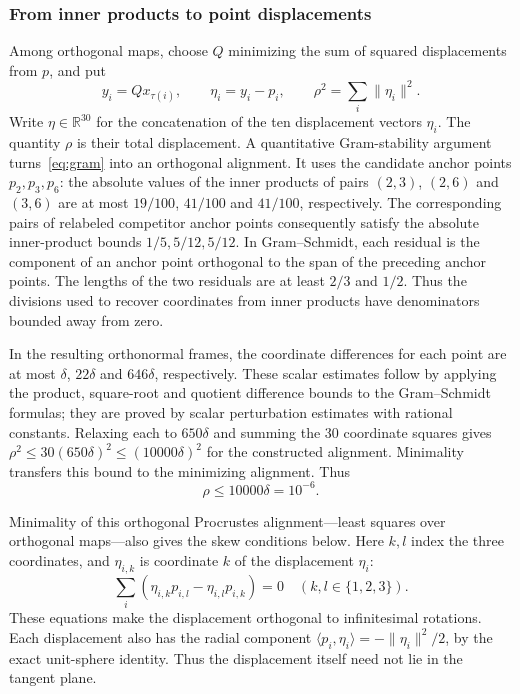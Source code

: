 \documentclass[11pt]{article}
\newcommand{\R}{\mathbb{R}}
\begin{document}
\subsubsection{From inner products to point displacements}
 Among orthogonal maps, choose $Q$ minimizing the sum of
squared displacements from $p$, and put
\[
 y_i=Qx_{\tau(i)},\qquad \eta_i=y_i-p_i,\qquad
 \rho^2=\sum_i\|\eta_i\|^2.
\]
Write $\eta\in\R^{30}$ for the concatenation of the ten displacement
vectors $\eta_i$. The quantity $\rho$ is their total displacement.
A quantitative Gram-stability argument turns~\eqref{eq:gram} into an
orthogonal alignment. It uses the candidate anchor points $p_2,p_3,p_6$:
the absolute values of the inner products of pairs $(2,3)$, $(2,6)$ and $(3,6)$ are at
most $19/100$, $41/100$ and $41/100$, respectively. The corresponding
pairs of relabeled competitor anchor points consequently satisfy the absolute
inner-product bounds $1/5,5/12,5/12$. In Gram--Schmidt, each residual
is the component of an anchor point orthogonal to the span of the
preceding anchor points. The lengths of the two residuals are at least
$2/3$ and $1/2$. Thus the divisions used to recover coordinates from
inner products have denominators bounded away from zero.

In the resulting orthonormal frames, the coordinate differences for each
point are at most $\delta$, $22\delta$ and $646\delta$, respectively.
These scalar estimates follow by applying the product, square-root and
quotient difference bounds to the Gram--Schmidt formulas; they are
proved by scalar perturbation estimates with rational constants. Relaxing each to
$650\delta$ and summing the 30 coordinate squares gives
$\rho^2\leq30(650\delta)^2\leq(10000\delta)^2$ for the constructed
alignment. Minimality transfers this bound to the minimizing alignment.
Thus
\[
 \rho\leq10000\delta=10^{-6}.
\]

Minimality of this orthogonal Procrustes alignment---least squares over
orthogonal maps---also gives the skew conditions below. Here $k,l$ index
the three coordinates, and $\eta_{i,k}$ is coordinate $k$ of the
displacement $\eta_i$:
\begin{equation}
 \sum_i (\eta_{i,k}p_{i,l}-\eta_{i,l}p_{i,k})=0
 \quad(k,l\in\{1,2,3\}).\label{eq:skew}
\end{equation}
These equations make the displacement orthogonal to infinitesimal
rotations. Each displacement
also has the radial component
$\langle p_i,\eta_i\rangle=-\|\eta_i\|^2/2$, by the exact unit-sphere identity.
Thus the displacement itself need not lie in the tangent plane.
\end{document}

